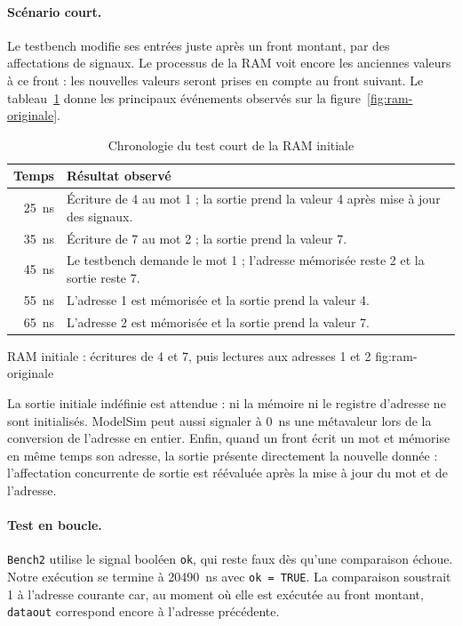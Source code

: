 \paragraph{Scénario court.}
Le testbench modifie ses entrées juste après un front montant, par des affectations de
signaux. Le processus de la RAM voit encore les anciennes valeurs à ce front : les
nouvelles valeurs seront prises en compte au front suivant. Le
tableau~\ref{tab:ram-chrono} donne les principaux événements observés sur la
figure~\ref{fig:ram-originale}.

\begin{table}[H]
\centering
\begin{tabularx}{\linewidth}{rX}
\toprule
Temps & Résultat observé \\
\midrule
25~ns & Écriture de 4 au mot 1 ; la sortie prend la valeur 4 après mise à jour des signaux. \\
35~ns & Écriture de 7 au mot 2 ; la sortie prend la valeur 7. \\
45~ns & Le testbench demande le mot 1 ; l'adresse mémorisée reste 2 et la sortie reste 7. \\
55~ns & L'adresse 1 est mémorisée et la sortie prend la valeur 4. \\
65~ns & L'adresse 2 est mémorisée et la sortie prend la valeur 7. \\
\bottomrule
\end{tabularx}
\caption{Chronologie du test court de la RAM initiale}
\label{tab:ram-chrono}
\end{table}

{RAM initiale : écritures de 4 et 7, puis lectures aux adresses 1 et 2}
{fig:ram-originale}

La sortie initiale indéfinie est attendue : ni la mémoire ni le registre d'adresse ne
sont initialisés. ModelSim peut aussi signaler à 0~ns une métavaleur lors de la conversion
de l'adresse en entier. Enfin, quand un front écrit un mot et mémorise en même temps son
adresse, la sortie présente directement la nouvelle donnée : l'affectation concurrente de
sortie est réévaluée après la mise à jour du mot et de l'adresse.

\paragraph{Test en boucle.}
\texttt{Bench2} utilise le signal booléen \texttt{ok}, qui reste faux dès qu'une comparaison
échoue. Notre exécution se termine à 20490~ns avec \texttt{ok = TRUE}. La comparaison
soustrait 1 à l'adresse courante car, au moment où elle est exécutée au front montant,
\texttt{dataout} correspond encore à l'adresse précédente.

